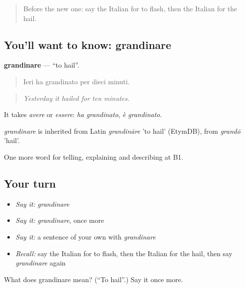 \begin{quote}
Before the new one: say the Italian for to flash, then the Italian for the hail.
\end{quote}

\subsection*{You'll want to know: grandinare}
\textbf{grandinare} — \textquotedblleft{}to hail\textquotedblright{}.

\begin{quote}
Ieri ha grandinato per dieci minuti.
\end{quote}

\begin{quote}
\emph{Yesterday it hailed for ten minutes.}
\end{quote}

It takes \emph{avere} or \emph{essere}: \emph{ha grandinato}, \emph{è grandinato}.

\begin{cousinweb}
\emph{grandinare} is inherited from Latin \emph{grandināre} 'to hail' (EtymDB), from \emph{grandō} 'hail'.
\end{cousinweb}

\begin{grammarlens}[title={What you've built}]
One more word for telling, explaining and describing at B1.
\end{grammarlens}

\subsection*{Your turn}
\begin{itemize}
\raggedright
  \item \emph{Say it:} \emph{grandinare}
  \item \emph{Say it:} \emph{grandinare}, once more
  \item \emph{Say it:} a sentence of your own with \emph{grandinare}
  \item \emph{Recall:} say the Italian for to flash, then the Italian for the hail, then say \emph{grandinare} again
\end{itemize}

\begin{tcolorbox}[breakable,colback=teal!4,colframe=teal!35!black,title={Before you move on}]
What does grandinare mean? (\textquotedblleft{}To hail\textquotedblright{}.) Say it once more.
\end{tcolorbox}
